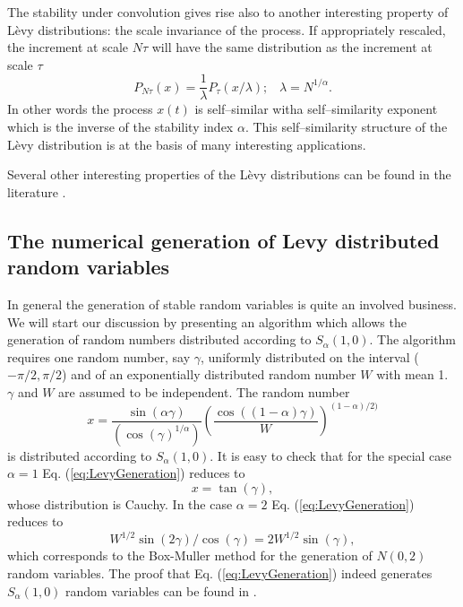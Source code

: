 The stability under convolution gives rise also to another interesting
property of L\`evy distributions: the scale invariance of the process. If
appropriately rescaled, the increment at scale $N \tau$ will have the same
distribution as the increment at scale $\tau$
\begin{displaymath}
  P_{N\tau}(x) = \frac{1}{\lambda} P_{\tau} (x/\lambda); \;\;\; 
  \lambda = N^{1/\alpha}.
\end{displaymath}
In other words the process $x(t)$ is self--similar witha self--similarity
exponent which is the inverse of the stability index $\alpha$. This
self--similarity structure of the L\`evy distribution is at the basis of many
interesting applications.

Several other interesting properties of the L\`evy distributions can be found
in the literature \cite{MontrollBendler,BouchadGeorges}.

\subsection{The numerical generation of Levy distributed random variables}
In general the generation of stable random variables is quite an involved
business. We will start our discussion by presenting an algorithm which allows
the generation of random numbers distributed according to $S_{\alpha}(1,0)$.
The algorithm requires one random number, say $\gamma$, uniformly distributed
on the interval ($-\pi/2,\pi/2$) and of an exponentially distributed random
number $W$ with mean 1. $\gamma$ and $W$ are assumed to be independent.
The random number
\begin{equation}
\label{eq:LevyGeneration}
  x= \frac{\sin(\alpha \gamma)}{(\cos(\gamma)^{1/\alpha})}
       \left(\frac{\cos((1-\alpha)\gamma)}{W} \right)^{(1-\alpha)/2)}
\end{equation}
is distributed according to $S_{\alpha}(1,0)$. It is easy to check that for
the special case $\alpha = 1$ Eq. (\ref{eq:LevyGeneration}) reduces to
\begin{displaymath}
  x = \tan(\gamma),
\end{displaymath}
whose distribution is Cauchy. In the case $\alpha =2$ 
Eq. (\ref{eq:LevyGeneration}) reduces to
\begin{displaymath}
  W^{1/2} \sin(2\gamma) / \cos(\gamma) = 2 W^{1/2} \sin(\gamma),
\end{displaymath}
which corresponds to the Box-Muller method for the generation of  $N(0,2)$
random variables. The proof that Eq. (\ref{eq:LevyGeneration}) indeed
generates $S_{\alpha}(1,0)$ random variables
can be found in \cite{Samorodnitsky}. 

